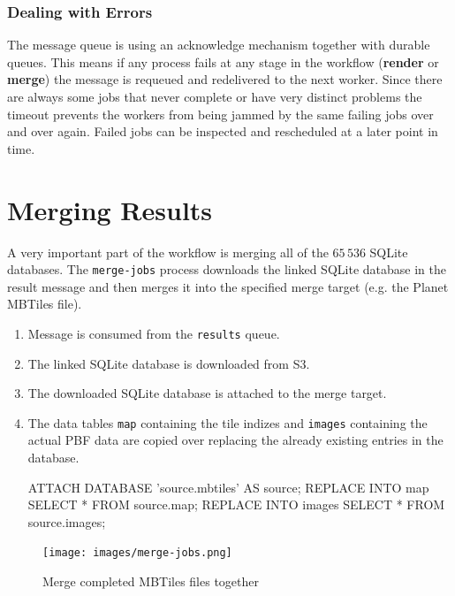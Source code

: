 \subsubsection*{Dealing with Errors}

The message queue is using an acknowledge mechanism together with durable queues.
This means if any process fails at any stage in the workflow (\textbf{render} or \textbf{merge}) the message is requeued and redelivered to the next worker.
Since there are always some jobs that never complete or have very distinct problems the timeout prevents the workers from being jammed by the same failing jobs over and over again.
Failed jobs can be inspected and rescheduled at a later point in time.

\newpage{}
\section{Merging Results}

A very important part of the workflow is merging all of the $65\,536$ SQLite databases.
The \texttt{merge-jobs} process downloads the linked SQLite database in the result message
and then merges it into the specified merge target (e.g. the Planet MBTiles file).

\begin{enumerate}  
    \item Message is consumed from the \texttt{results} queue.
    \item The linked SQLite database is downloaded from S3.
    \item The downloaded SQLite database is attached to the merge target.
    \item  The data tables \texttt{map} containing the tile indizes and \texttt{images} containing the actual PBF data are copied over replacing the already existing entries in the database.
    
\begin{sqlcode}
ATTACH DATABASE 'source.mbtiles' AS source;
REPLACE INTO map SELECT * FROM source.map;
REPLACE INTO images SELECT * FROM source.images;
\end{sqlcode}
    
\end{enumerate}

\begin{figure}[H]
  \centering
  \texttt{[image: images/merge-jobs.png]}
  \caption{Merge completed MBTiles files together}
\end{figure}

